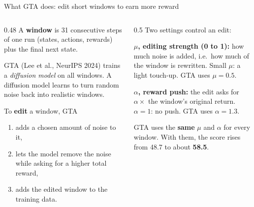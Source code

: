 \documentclass[aspectratio=169,10pt]{beamer}
\begin{document}
\begin{frame}{What GTA does: edit short windows to earn more reward}
\begin{columns}[T]
\begin{column}{0.48\linewidth}
A \textbf{window} is 31 consecutive steps of one run (states, actions, rewards) plus the final next state.
\vspace{0.4em}

GTA (Lee et al., NeurIPS 2024) trains a \emph{diffusion model} on all windows. A diffusion model learns to turn random noise back into realistic windows.
\vspace{0.4em}

To \textbf{edit} a window, GTA
\begin{enumerate}
\item adds a chosen amount of noise to it,
\item lets the model remove the noise while asking for a higher total reward,
\item adds the edited window to the training data.
\end{enumerate}
\end{column}
\begin{column}{0.5\linewidth}
Two settings control an edit:
\vspace{0.3em}

\textbf{$\mu$, editing strength (0 to 1):} how much noise is added, i.e.\ how much of the window is rewritten. Small $\mu$: a light touch-up. GTA uses $\mu = 0.5$.
\vspace{0.4em}

\textbf{$\alpha$, reward push:} the edit asks for $\alpha \times$ the window's original return. $\alpha = 1$: no push. GTA uses $\alpha = 1.3$.
\vspace{0.6em}

GTA uses the \textbf{same} $\mu$ and $\alpha$ for every window. With them, the score rises from 48.7 to about \textbf{58.5}.
\end{column}
\end{columns}
\end{frame}
\end{document}

